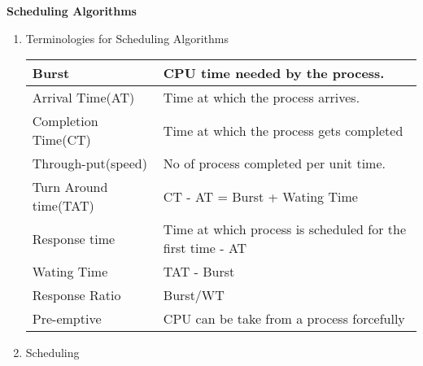 
\centerline{\textbf{ \LARGE Scheduling Algorithms}}




\begin{enumerate}

  \item Terminologies for Scheduling Algorithms

  \begin{myTableStyle}
    \begin{tabular}{ |l|l| } \hline
        Burst                 &     CPU time needed by the process.                             \\ \hline
        Arrival Time(AT)      &     Time at which the process arrives.                          \\ \hline
        Completion Time(CT)   &     Time at which the process gets completed                    \\ \hline
        Through-put(speed)    &     No of process completed per unit time.                      \\ \hline
        Turn Around time(TAT) &     CT - AT   =  Burst + Wating Time                            \\ \hline
        Response time         &     Time at which process is scheduled for the first time - AT  \\ \hline
        Wating Time           &     TAT -  Burst                                                \\ \hline
        Response Ratio        &     Burst/WT                                                    \\ \hline
        Pre-emptive           &     CPU can be take from a process forcefully                   \\ \hline
    \end{tabular}
  \end{myTableStyle}

  \item Scheduling


\end{enumerate}
